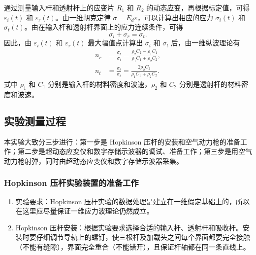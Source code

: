\documentclass[UTF8,a4paper,12pt]{ctexart}
\numberwithin{equation}{section}
\begin{document}
通过测量输入杆和透射杆上的应变片 $R_1$ 和 $R_2$ 的动态应变，再根据标定值，可得 $\varepsilon_i(t)$ 和 $\varepsilon_r(t)$。由一维胡克定律 $\sigma=E_d\varepsilon$，可以计算出相应的应力 $\sigma_i(t)$ 和 $\sigma_t(t)$。由在输入杆和透射杆界面上的应力连续条件，可得
\begin{equation}
  \sigma_i+\sigma_r=\sigma_t.
\end{equation}
因此，由 $\varepsilon_i(t)$ 和 $\varepsilon_r(t)$ 最大幅值点计算出 $\sigma_i$ 和 $\sigma_t$ 后，由一维纵波理论有
\begin{subequations}
\begin{align}
  n_r&=\frac{\sigma_r}{\sigma_i}
      =\frac{\rho_2C_2-\rho_1C_1}{\rho_1C_1+\rho_2C_2},\\
  n_t&=\frac{\sigma_t}{\sigma_i}
      =\frac{2\rho_2C_2}{\rho_1C_1+\rho_2C_2}.
\end{align}
\end{subequations}
式中 $\rho_1$ 和 $C_1$ 分别是输入杆的材料密度和波速，$\rho_2$ 和 $C_2$ 分别是透射杆的材料密度和波速。

\subsection{实验测量过程}
本实验大致分三步进行：第一步是 Hopkinson 压杆的安装和空气动力枪的准备工作；第二步是超动态应变仪和数字存储示波器的调试、准备工作；第三步是用空气动力枪射弹，同时由超动态应变仪和数字存储示波器采集。

\subsubsection{Hopkinson 压杆实验装置的准备工作}
\begin{enumerate}
  \item 实验要求：Hopkinson 压杆实验的数据处理是建立在一维假定基础上的，所以在这里应尽量保证一维应力波理论仍然成立。
  \item Hopkinson 压杆安装：根据实验要求选择合适的输入杆、透射杆和吸收杆。安装时要仔细调节导轨上的螺钉，使三根杆及加载头之间每个界面都要完全接触（不能有缝隙），界面完全重合（不能错开），且保证杆轴都在同一条直线上。
\end{enumerate}
\end{document}
